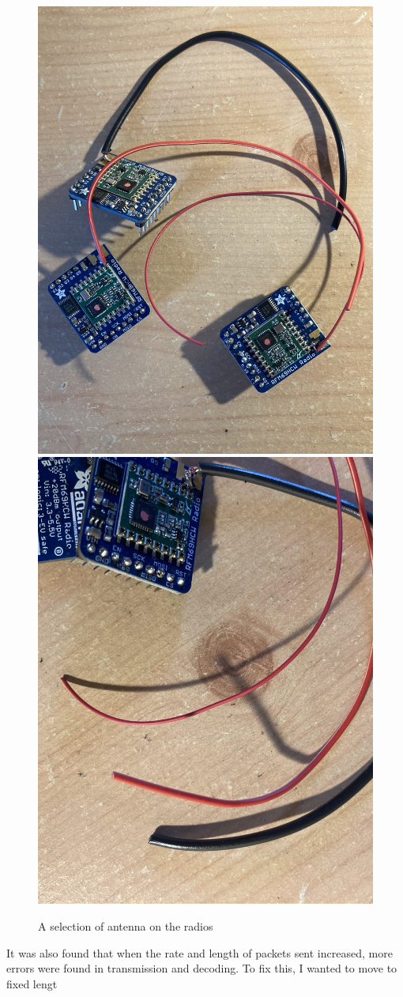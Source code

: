 \documentclass[12pt,a4paper]{report}
\begin{document}
\begin{figure}[h]
\begin{center}
\includegraphics[scale=0.1]{wires1.jpeg}           \includegraphics[scale=0.12]{wires2.jpeg}
\end{center}
\caption{A selection of antenna on the radios}
\end{figure}
\FloatBarrier
It was also found that when the rate and length of packets sent increased, more errors were found in transmission and decoding. To fix this, I wanted to move to fixed lengt
\end{document}
